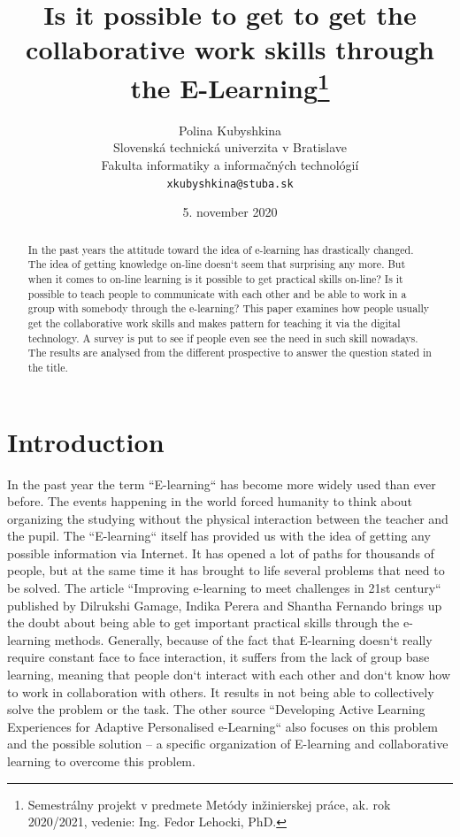 \documentclass[10pt,twoside,English,a4paper]{article}
\title{Is it possible to get  to get the collaborative work skills through the E-Learning\thanks{Semestrálny projekt v predmete Metódy inžinierskej práce, ak. rok 2020/2021, vedenie: Ing. Fedor Lehocki, PhD.}} %
\author{Polina Kubyshkina\\[2pt]
	{\small Slovenská technická univerzita v Bratislave}\\
	{\small Fakulta informatiky a informačných technológií}\\
	{\small \texttt{xkubyshkina@stuba.sk}}
	}
\date{\small  5. november 2020} %
\begin{document}
\maketitle

\begin{abstract}
In the past years the attitude toward the idea of e-learning has drastically changed. The idea of getting knowledge on-line doesn`t seem that surprising any more. But when it comes to on-line learning is it possible to get practical skills on-line? Is it possible to teach people to communicate with each other and be able to work in a group with somebody through the e-learning?
This paper examines how people usually get the collaborative work skills and makes pattern for teaching it via the digital technology. A survey is put to see if people even see the need in such skill nowadays. The results are analysed from the different prospective to answer the question stated in the title.
\end{abstract}

\section{Introduction}

In the past year the term ``E-learning`` has become more widely used than ever before. The events happening in the world forced humanity to think about organizing the studying without the physical interaction between the teacher and the pupil. The ``E-learning`` itself has provided us with the idea of getting any possible information via Internet. It has opened a lot of paths for thousands of people, but at the same time it has brought to life several problems that need to be solved. The article ``Improving e-learning to meet challenges in 21st century`` published by Dilrukshi Gamage, Indika Perera and Shantha Fernando brings up the doubt about being able to get important practical skills through the e-learning methods.\cite{collab2} Generally, because of the fact that E-learning doesn`t really require constant face to face interaction, it suffers from the lack of group base learning, meaning that people don`t interact with each other and don`t know how to work in collaboration with others. It results in not being able to collectively solve the problem or the task. The other source ``Developing Active Learning Experiences for Adaptive Personalised e-Learning`` also focuses on this problem and the possible solution – a specific organization of E-learning and collaborative learning to overcome this problem.\cite{collab1}
\end{document}
